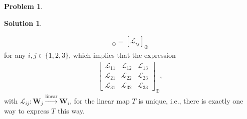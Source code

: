 \documentclass{article}
\theoremstyle{definition}
\newtheorem*{prob*}{Problem}
\newtheorem*{sln*}{Solution}
\newcommand{\W}{\mathbf{W}}
\newcommand{\lag}{\mathcal{L}}
\newcommand{\M}{\mathcal{M}}
\newcommand{\lin}{\overset{\text{linear}}{\longrightarrow}}
\begin{document}
\begin{prob*}
\begin{sln*}
\begin{enumerate}
\begin{align*}
			 [\M_{ij}]_\oplus = [\lag_{ij}]_\oplus
			 \end{align*}
			for any $i,j\in \{1,2,3 \}$, which implies that the expression 
			\begin{align*}
			\begin{bmatrix}
			\lag_{11} & \lag_{12} & \lag_{13}\\
			\lag_{21} & \lag_{22} & \lag_{23}\\
			\lag_{31} & \lag_{32} & \lag_{33}
			\end{bmatrix}_\oplus, 
			\end{align*}
			with $\lag_{ij} : \W_j \lin \W_i$, for the linear map $T$ is unique, i.e., there is exactly one way to express $T$ this way.
			
			\newpage
			
			
			
			
			
			
			

\end{enumerate}
\end{sln*}
\end{prob*}
\end{document}
